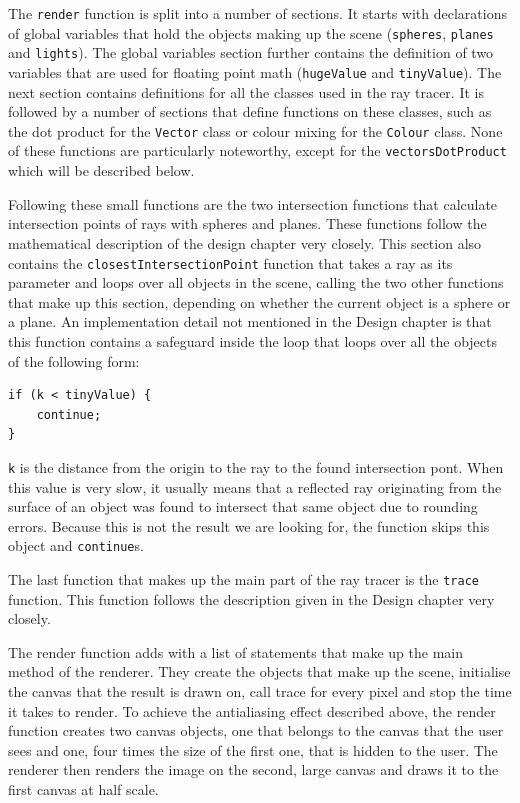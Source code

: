 \documentclass[11pt]{report}
\begin{document}
The \texttt{render} function is split into a number of sections. It starts with declarations of global variables that hold the objects making up the scene (\texttt{spheres}, \texttt{planes} and \texttt{lights}). The global variables section further contains the definition of two variables that are used for floating point math (\texttt{hugeValue} and \texttt{tinyValue}). The next section contains definitions for all the classes used in the ray tracer. It is followed by a number of sections that define functions on these classes, such as the dot product for the \texttt{Vector} class or colour mixing for the \texttt{Colour} class. None of these functions are particularly noteworthy, except for the \texttt{vectorsDotProduct} which will be described below.

Following these small functions are the two intersection functions that calculate intersection points of rays with spheres and planes. These functions follow the mathematical description of the design chapter very closely. This section also contains the \texttt{closestIntersectionPoint} function that takes a ray as its parameter and loops over all objects in the scene, calling the two other functions that make up this section, depending on whether the current object is a sphere or a plane. An implementation detail not mentioned in the Design chapter is that this function contains a safeguard inside the loop that loops over all the objects of the following form:

\begin{lstlisting}
if (k < tinyValue) {
    continue;
}
\end{lstlisting}

\texttt{k} is the distance from the origin to the ray to the found intersection pont. When this value is very slow, it usually means that a reflected ray originating from the surface of an object was found to intersect that same object due to rounding errors. Because this is not the result we are looking for, the function skips this object and \texttt{continue}s.

The last function that makes up the main part of the ray tracer is the \texttt{trace} function. This function follows the description given in the Design chapter very closely.

The render function adds with a list of statements that make up the main method of the renderer. They create the objects that make up the scene, initialise the canvas that the result is drawn on, call trace for every pixel and stop the time it takes to render. To achieve the antialiasing effect described above, the render function creates two canvas objects, one that belongs to the canvas that the user sees and one, four times the size of the first one, that is hidden to the user. The renderer then renders the image on the second, large canvas and draws it to the first canvas at half scale. 
\end{document}
